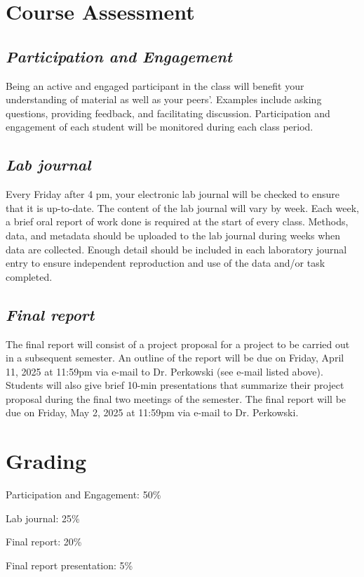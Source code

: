 \documentclass[12pt, notitlepage]{article}   	%
\begin{document}
{\section{Course Assessment}
\subsection{\textit{Participation and Engagement}}
Being an active and engaged participant in the class will benefit your understanding of material as well as your peers'. Examples include asking questions, providing feedback, and facilitating discussion. Participation and engagement of each student will be monitored during each class period.

\subsection{\textit{Lab journal}}
Every Friday after 4 pm, your electronic lab journal will be checked to ensure that it is up-to-date. The content of the lab journal will vary by week. Each week, a brief oral report of work done is required at the start of every class. Methods, data, and metadata should be uploaded to the lab journal during weeks when data are collected. Enough detail should be included in each laboratory journal entry to ensure independent reproduction and use of the data and/or task completed.

\subsection{\textit{Final report}}
The final report will consist of a project proposal for a project to be carried out in a subsequent semester. An outline of the report will be due on Friday, April 11, 2025 at 11:59pm via e-mail to Dr. Perkowski (see e-mail listed above). Students will also give brief 10-min presentations that summarize their project proposal during the final two meetings of the semester. The final report will be due on Friday, May 2, 2025 at 11:59pm via e-mail to Dr. Perkowski.\par

\section{Grading}
Participation and Engagement: 50\% \par
Lab journal: 25\% \par
Final report: 20\% \par
Final report presentation: 5\%\par

}
\end{document}
